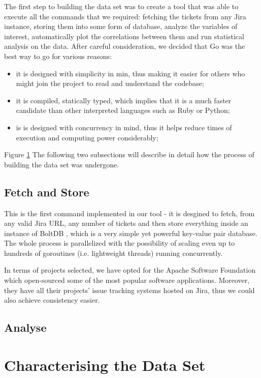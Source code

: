 \documentclass{mpaper}
\begin{document}
The first step to building the data set was to create a tool that was able to execute all the commands that we required:
fetching the tickets from any Jira instance, storing them into some form of database, analyze the variables of interest, 
automatically plot the correlations between them and run statistical analysis on the data. After careful consideration, 
we decided that Go was the best way to go for various reasons:
  \begin{itemize}
    \item it is designed with simplicity in min, thus making it easier for others who might join the project to read 
    and understand the codebase;
    \item it is compiled, statically typed, which implies that it is a much faster candidate than other interpreted languages
    such as Ruby or Python;
    \item is is designed with concurrency in mind, thus it helps reduce times of execution and computing power considerably;
  \end{itemize}

Figure \ref{} The following two subsections will describe in detail how the process of building the data set was undergone.

\subsection{Fetch and Store}

This is the first command implemented in our tool - it is desgined to fetch, from any valid Jira URL, any number of tickets 
and then store everything inside an instance of BoltDB \cite{bolt}, which is a very simple yet powerful key-value pair 
database. The whole process is parallelized with the possibility of scaling even up to hundreds of goroutines
(i.e. lightweight threads) running concurrently.

In terms of projects selected, we have opted for the Apache Software Foundation which open-sourced some of the most popular
software applications. Moreover, they have all their projects' issue tracking systems hosted on Jira, thus we could also 
achieve consistency easier. 

\subsection{Analyse}

\section{Characterising the Data Set}
\end{document}
